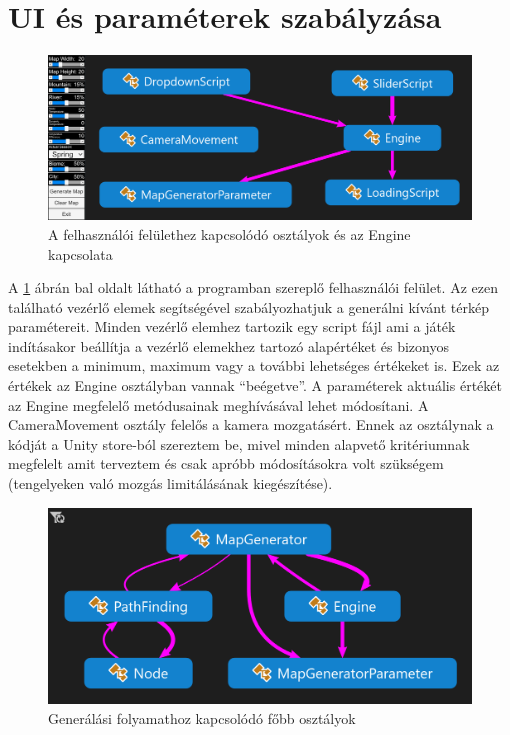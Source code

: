 \section{UI és paraméterek szabályzása}

\begin{figure}[h!]
\centering
\includegraphics[scale=0.37]{kepek/UI.png}
\caption{A felhasználói felülethez kapcsolódó osztályok és az Engine kapcsolata}
\label{fig:UI}
\end{figure}

\noindent A \ref{fig:UI} ábrán bal oldalt látható a programban szereplő felhasználói felület. Az ezen található vezérlő elemek segítségével szabályozhatjuk a generálni kívánt térkép paramétereit. Minden vezérlő elemhez tartozik egy script fájl ami a játék indításakor beállítja a vezérlő elemekhez tartozó alapértéket és bizonyos esetekben a minimum, maximum vagy a további lehetséges értékeket is. Ezek az értékek az Engine osztályban vannak “beégetve”. A paraméterek aktuális értékét az Engine megfelelő metódusainak meghívásával lehet módosítani.
\newline
\newline A CameraMovement osztály felelős a kamera mozgatásért. Ennek az osztálynak a kódját a Unity store-ból szereztem be, mivel minden alapvető kritériumnak megfelelt amit terveztem és csak apróbb módosításokra volt szükségem (tengelyeken való mozgás limitálásának kiegészítése). 

\begin{figure}[h!]
\centering
\includegraphics[scale=0.4]{kepek/generalas.png}
\caption{Generálási folyamathoz kapcsolódó főbb osztályok}
\label{fig:generalas}
\end{figure}

